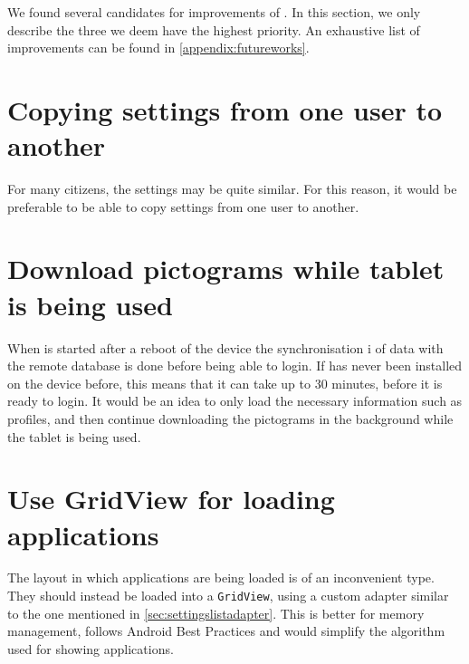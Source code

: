 We found several candidates for improvements of \launcher.
In this section, we only describe the three we deem have the highest priority.
An exhaustive list of improvements can be found in \cref{appendix:futureworks}.

\section{Copying settings from one user to another}
For many citizens, the settings may be quite similar.
For this reason, it would be preferable to be able to copy settings from one user to another.

\section{Download pictograms while tablet is being used}
When \launcher is started after a reboot of the device the synchronisation i of data with the remote database is done before being able to login.
If \launcher has never been installed on the device before, this means that it can take up to 30 minutes, before it is ready to login.
It would be an idea to only load the necessary information such as profiles, and then continue downloading the pictograms in the background while the tablet is being used.


\section{Use GridView for loading applications}
The layout in which applications are being loaded is of an inconvenient type. 
They should instead be loaded into a \lstinline|GridView|, using a custom adapter similar to the one mentioned in \cref{sec:settingslistadapter}. 
This is better for memory management, follows Android Best Practices and would simplify the algorithm used for showing applications. 